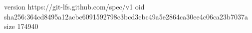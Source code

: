 version https://git-lfs.github.com/spec/v1
oid sha256:364cd8495a12acbc6091592798c3bcd3cbc49a5e2864ca30ee4c06ca23b7037a
size 174940
